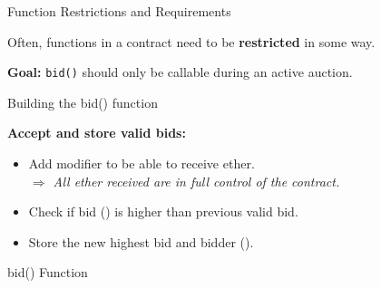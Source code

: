 \documentclass[handout]{beamer}
\begin{document}
\begin{frame}{Function Restrictions and Requirements}

\vspace{1 em}
Often, functions in a contract need to be \textbf{restricted} in some way.

\vspace{0.5em}

\textbf{Goal:} \texttt{bid()} should only be callable during an active auction.

	
\end{frame}

%
\begin{frame}{Building the bid() function}

\vspace{1em}

\textbf{Accept and store valid bids:}
\begin{itemize}
	\item Add  modifier to be able to receive ether.\\
	\textit{$\Rightarrow$ All ether received are in full control of the contract.}
	\item Check if bid () is higher than previous valid bid.
	\item Store the new highest bid and bidder ().
\end{itemize}

\vspace{1em}
\begin{samplecode}{bid() Function}
	
\end{samplecode}


\end{frame}
\end{document}
